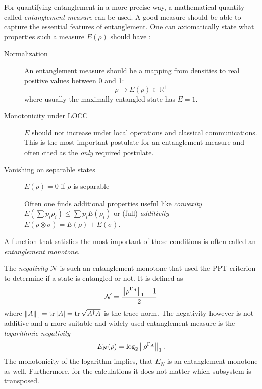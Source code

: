 For quantifying entanglement in a more precise way, a mathematical quantity called \emph{entanglement measure} can be used. A good measure should be able to capture the essential features of entanglement. One can axiomatically state what properties such a measure $E(\rho)$ should have \cite{Plenio_2005a,Horodecki_2009}:
\begin{description}
  \item[Normalization] An entanglement measure should be a mapping from densities to real positive values between 0 and 1:
  \begin{equation}
    \rho \rightarrow E(\rho) \in \mathbb{R}^+
  \end{equation}
  where usually the maximally entangled state has $E=1$.
  \item[Monotonicity under LOCC] $E$ should not increase under local operations and classical communications. This is the most important postulate for an entanglement measure and often cited as the \textit{only} required postulate.
  \item[Vanishing on separable states] $E(\rho)=0$ if $\rho$ is separable
  \item[] Often one finds additional properties useful like \textit{convexity} $E(\sum p_i \rho_i) \leq \sum p_i E(\rho_i)$ or (full) \textit{additivity} $E(\rho \otimes \sigma) = E(\rho) + E(\sigma)$.
\end{description}
A function that satisfies the most important of these conditions is often called an \textit{entanglement monotone}.

The \emph{negativity} $\mathcal{N}$ is such an entanglement monotone \cite{Vidal_2001,Plenio_2005a} that used the PPT criterion to determine if a state is entangled or not. It is defined as 
\begin{equation}\label{eq:2:negativity}
  \mathcal{N} = \frac{\left\lVert\rho^{\Gamma_A}\right\rVert_1 - 1}{2}
\end{equation}
where $\left\lVert A\right\rVert_1 = \tr\left\lvert A\right\rvert = \tr \sqrt{A^\dagger A}$ is the trace norm. The negativity however is not additive and a more suitable and widely used entanglement measure is the \emph{logarithmic negativity} \cite{Plenio_2005,Horodecki_2009,Plenio_2005a}
\begin{equation}\label{eq:2:logarithmic-negativity}
  E_N(\rho) = \log_2\left\lVert\rho^{\Gamma_A}\right\rVert_1 .
\end{equation}
The monotonicity of the logarithm implies, that $E_N$ is an entanglement monotone as well.
Furthermore, for the calculations it does not matter which subsystem is transposed.

